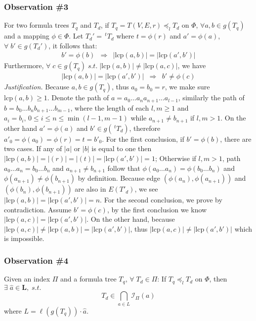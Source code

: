 \subsubsection*{Observation \#3} 
For two formula trees $T_q$ and $T_d$, if $T_q = T(V,E,r) \preceq_l T_d$ on $\Phi$,  
$\forall a,b \in g(T_q)$ and a mapping $\phi \in \Phi$. 
Let $T_d' = \, ^{t}T_d$ where $t = \phi(r)$ and $a' = \phi(a)$, $\forall\; b' \in g(T_d')$, it follows that:
$$
\begin{array}{lcr}
b' = \phi(b)  & \Rightarrow & 
\left| \mathrm{lcp}(a,b) \right| = \left| \mathrm{lcp}(a',b') \right|
\end{array}
$$
Furthermore, $\forall\; c \in g(T_q)\; s.t.\; \left| \mathrm{lcp}(a,b) \right| \neq \left| \mathrm{lcp}(a,c) \right| $, we have
$$
\begin{array}{lcr}
\left| \mathrm{lcp}(a,b) \right| = \left| \mathrm{lcp}(a',b') \right|
& \Rightarrow &
b' \neq \phi(c)
\end{array} 
$$
\textit{Justification.} 
Because $a,b \in g(T_q)$, thus $a_0 = b_0 = r$, we make sure $\mathrm{lcp}(a,b) \ge 1$. 
Denote the path of $a = a_0 \ldots a_n a_{n+1} \ldots a_{l-1}$, similarly the path of $b=b_0 \ldots b_n b_{n+1} \ldots b_{m-1}$,
where the length of each $l,m \ge 1$ and $a_i = b_i,\, 0 \le i \le n \le \min(l-1, m-1)$ while $a_{n+1} \neq b_{n+1}$ if $l,m > 1$.
On the other hand $a' = \phi(a)$ and $b' \in g(\,^{t}T_d)$, therefore $a'_0 = \phi(a_0) = \phi(r) = t = b'_0$.
For the first conclusion, if $b' = \phi(b)$, there are two cases. If any of $|a|$ or $|b|$ is equal to one then $\left| \mathrm{lcp}(a,b) \right| = |(r)| = |(t)| = \left| \mathrm{lcp}(a',b') \right| = 1$;
Otherwise if $l,m > 1$, path $a_0 \ldots a_n = b_0 \ldots b_n$ and $a_{n+1} \neq b_{n+1}$ follow that $\phi(a_0 \ldots a_n) = \phi(b_0 \ldots b_n)$ and $\phi(a_{n+1}) \neq \phi(b_{n+1})$ by definition.
Because edge $(\phi(a_n), \phi(a_{n+1}))$ and $(\phi(b_n), \phi(b_{n+1}))$ are also in $E(T'_d)$, 
we see $\left| \mathrm{lcp}(a,b) \right| = \left| \mathrm{lcp}(a',b') \right| = n$.
For the second conclusion, we prove by contradiction. 
Assume $b' = \phi(c)$, by the first conclusion we know $\left| \mathrm{lcp}(a,c) \right| = \left| \mathrm{lcp}(a',b') \right|$.
On the other hand, because $\left| \mathrm{lcp}(a,c) \right| \neq \left| \mathrm{lcp}(a,b) \right| =  \left| \mathrm{lcp}(a',b') \right|$, 
thus $\left| \mathrm{lcp}(a,c) \right| \neq \left| \mathrm{lcp}(a',b') \right|$ which is impossible. 

\subsubsection*{Observation \#4} 
Given an index $\Pi$ and a formula tree $T_q$, $\forall\; T_d \in \Pi$:
If $T_q \preceq_l T_d$ on $\Phi$, then $\exists\; \hat{a} \in \mathbf{L},\; s.t.$
$$
T_d \in \bigcap_{a \in L} \mathcal{I}_{\Pi}(a)
$$
where $L = \ell(g(T_q)) \cdot \hat{a}$.

